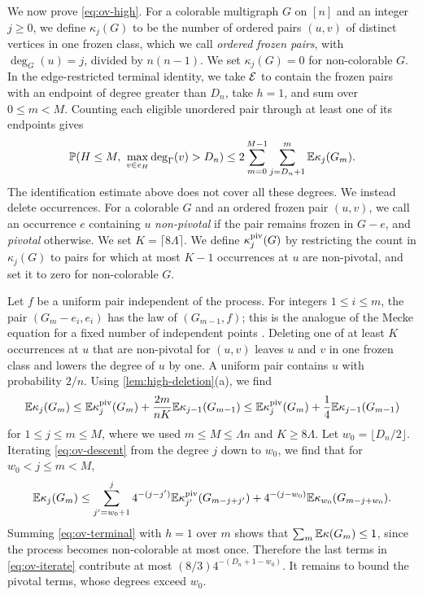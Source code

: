We now prove \eqref{eq:ov-high}. For a colorable multigraph $G$ on $[n]$ and an integer $j \ge 0$, we define $\kappa_j(G)$ to be the number of ordered pairs $(u, v)$ of distinct vertices in one frozen class, which we call \emph{ordered frozen pairs}, with $\deg_G(u) = j$, divided by $n(n - 1)$. We set $\kappa_j(G) = 0$ for non-colorable $G$. In the edge-restricted terminal identity, we take $\mathcal E$ to contain the frozen pairs with an endpoint of degree greater than $D_n$, take $h = 1$, and sum over $0 \le m < M$. Counting each eligible unordered pair through at least one of its endpoints gives
\[
\mathbb P(H \le M, \ \max_{v \in e_H}\deg_\Gamma(v) > D_n)
\le 2\sum_{m = 0}^{M - 1}\sum_{j = D_n + 1}^{m}\mathbb E\kappa_j(G_m).
\]
The identification estimate above does not cover all these degrees. We instead delete occurrences. For a colorable $G$ and an ordered frozen pair $(u, v)$, we call an occurrence $e$ containing $u$ \emph{non-pivotal} if the pair remains frozen in $G - e$, and \emph{pivotal} otherwise. We set $K = \lceil8\Lambda\rceil$. We define $\kappa_j^{\rm piv}(G)$ by restricting the count in $\kappa_j(G)$ to pairs for which at most $K - 1$ occurrences at $u$ are non-pivotal, and set it to zero for non-colorable $G$.

Let $f$ be a uniform pair independent of the process. For integers $1 \le i \le m$, the pair $(G_m - e_i, e_i)$ has the law of $(G_{m - 1}, f)$; this is the analogue of the Mecke equation for a fixed number of independent points \cite[Theorem~4.1]{last2018lectures}. Deleting one of at least $K$ occurrences at $u$ that are non-pivotal for $(u, v)$ leaves $u$ and $v$ in one frozen class and lowers the degree of $u$ by one. A uniform pair contains $u$ with probability $2/n$. Using \cref{lem:high-deletion}(a), we find
\begin{equation}\label{eq:ov-descent}
\mathbb E \kappa_j(G_m) \le \mathbb E \kappa_j^{\rm piv}(G_m) + \frac{2m}{nK} \mathbb E \kappa_{j - 1}(G_{m - 1}) \le \mathbb E \kappa_j^{\rm piv}(G_m) + \frac{1}{4} \mathbb E \kappa_{j - 1}(G_{m - 1})
\end{equation}
for $1 \le j \le m \le M$, where we used $m \le M \le \Lambda n$ and $K \ge 8\Lambda$. Let $w_0 = \lfloor D_n/2 \rfloor$. Iterating \eqref{eq:ov-descent} from the degree $j$ down to $w_0$, we find that for $w_0 < j \le m < M$,
\begin{equation}\label{eq:ov-iterate}
\mathbb E \kappa_j(G_m) \le \sum_{j' = w_0 + 1}^{j} 4^{-(j - j')} \mathbb E \kappa_{j'}^{\rm piv}(G_{m - j + j'}) + 4^{-(j - w_0)} \mathbb E \kappa_{w_0}(G_{m - j + w_0}).
\end{equation}
Summing \eqref{eq:ov-terminal} with $h = 1$ over $m$ shows that $\sum_m \mathbb E \kappa(G_m) \le 1$, since the process becomes non-colorable at most once. Therefore the last terms in \eqref{eq:ov-iterate} contribute at most $(8/3) 4^{-(D_n + 1 - w_0)}$. It remains to bound the pivotal terms, whose degrees exceed $w_0$.

